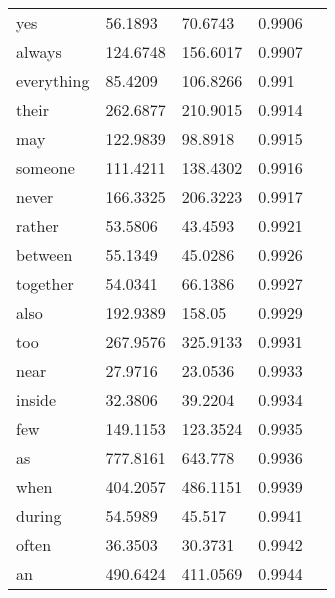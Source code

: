 \begin{table}[H]
\begin{tabular}{@{}lllll@{}}
		yes           & 56.1893                & 70.6743                  & 0.9906           &  \\
		always        & 124.6748               & 156.6017                 & 0.9907           &  \\
		everything    & 85.4209                & 106.8266                 & 0.991            &  \\
		their         & 262.6877               & 210.9015                 & 0.9914           &  \\
		may           & 122.9839               & 98.8918                  & 0.9915           &  \\
		someone       & 111.4211               & 138.4302                 & 0.9916           &  \\
		never         & 166.3325               & 206.3223                 & 0.9917           &  \\
		rather        & 53.5806                & 43.4593                  & 0.9921           &  \\
		between       & 55.1349                & 45.0286                  & 0.9926           &  \\
		together      & 54.0341                & 66.1386                  & 0.9927           &  \\
		also          & 192.9389               & 158.05                   & 0.9929           &  \\
		too           & 267.9576               & 325.9133                 & 0.9931           &  \\
		near          & 27.9716                & 23.0536                  & 0.9933           &  \\
		inside        & 32.3806                & 39.2204                  & 0.9934           &  \\
		few           & 149.1153               & 123.3524                 & 0.9935           &  \\
		as            & 777.8161               & 643.778                  & 0.9936           &  \\
		when          & 404.2057               & 486.1151                 & 0.9939           &  \\
		during        & 54.5989                & 45.517                   & 0.9941           &  \\
		often         & 36.3503                & 30.3731                  & 0.9942           &  \\
		an            & 490.6424               & 411.0569                 & 0.9944           &  \\

\end{tabular}
\end{table}
